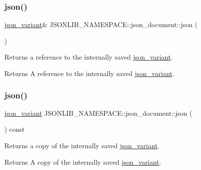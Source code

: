 \subsubsection{\texorpdfstring{json()}{json()}\hspace{0.1cm}{\footnotesize\ttfamily [3/4]}}
{\footnotesize\ttfamily \hyperlink{classJSONLIB__NAMESPACE_1_1json__variant}{json\+\_\+variant}\& J\+S\+O\+N\+L\+I\+B\+\_\+\+N\+A\+M\+E\+S\+P\+A\+C\+E\+::json\+\_\+document\+::json (\begin{DoxyParamCaption}{ }\end{DoxyParamCaption})}



Returns a reference to the internally saved \hyperlink{classJSONLIB__NAMESPACE_1_1json__variant}{json\+\_\+variant}. 

\begin{DoxyReturn}{Returns}
A reference to the internally saved \hyperlink{classJSONLIB__NAMESPACE_1_1json__variant}{json\+\_\+variant}. 
\end{DoxyReturn}
\mbox{\label{classJSONLIB__NAMESPACE_1_1json__document_afc25f82f6d2729be0ae1bcc82b8968e3}} 
\subsubsection{\texorpdfstring{json()}{json()}\hspace{0.1cm}{\footnotesize\ttfamily [4/4]}}
{\footnotesize\ttfamily \hyperlink{classJSONLIB__NAMESPACE_1_1json__variant}{json\+\_\+variant} J\+S\+O\+N\+L\+I\+B\+\_\+\+N\+A\+M\+E\+S\+P\+A\+C\+E\+::json\+\_\+document\+::json (\begin{DoxyParamCaption}{ }\end{DoxyParamCaption}) const}



Returns a copy of the internally saved \hyperlink{classJSONLIB__NAMESPACE_1_1json__variant}{json\+\_\+variant}. 

\begin{DoxyReturn}{Returns}
A copy of the internally saved \hyperlink{classJSONLIB__NAMESPACE_1_1json__variant}{json\+\_\+variant}. 
\end{DoxyReturn}
\mbox{\label{classJSONLIB__NAMESPACE_1_1json__document_a20dc761125ccf91f7747f28a7c356be7}} 
